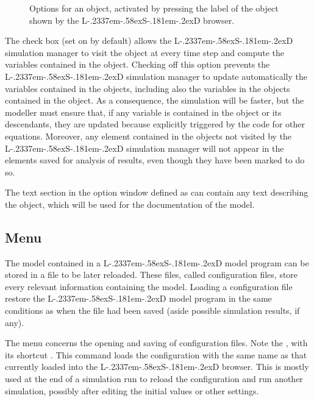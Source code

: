 \documentclass [11pt,a4paper] {book}
\def\LsD{{L\kern-.2337em\lower-.58ex\hbox{S}\kern-.181em\lower-.2ex\hbox{D}}\xspace}
\begin{document}
\begin{figure}[ht]
  \centering
  \caption{Options for an object, activated by pressing the label of the object shown by the \LsD browser.}
  \label{fig:obj_opt}
\end{figure}


The check box  (set on by default) allows the \LsD simulation manager to visit the object at every time step and compute the variables contained in the object. Checking off this option prevents the \LsD simulation manager to update automatically the variables contained in the objects, including also the variables in the objects contained in the object. As a consequence, the simulation will be faster, but the modeller must ensure that, if any variable is contained in the object or its descendants, they are updated because explicitly triggered by the code for other equations. Moreover, any element contained in the objects not visited by the \LsD simulation manager will not appear in the elements saved for analysis of results, even though they have been marked to do so.

The text section in the option window defined as  can contain any text describing the object, which will be used for the documentation of the model.



\subsection{Menu }

The model contained in a \LsD model program can be stored in a file to be later reloaded. These files, called configuration files, store every relevant information containing the model. Loading a configuration file restore the \LsD model program in the same conditions as when the file had been saved (aside possible simulation results, if any).

The menu  concerns the opening and saving of configuration files. Note the , with its shortcut . This command loads the configuration with the same name as that currently loaded into the \LsD browser. This is mostly used at the end of a simulation run to reload the configuration and run another simulation, possibly after editing the initial values or other settings.
\end{document}
